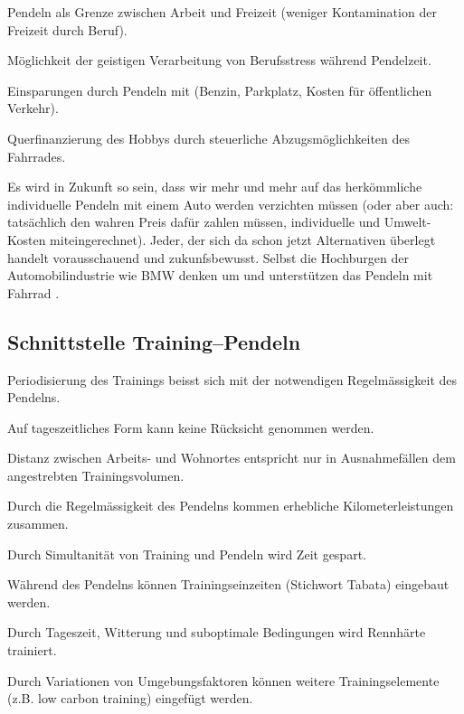   \begin{itemize*}
    \item Pendeln als Grenze zwischen Arbeit und Freizeit (weniger Kontamination der Freizeit durch Beruf).
    \item Möglichkeit der geistigen Verarbeitung von Berufsstress während Pendelzeit.
    \item Einsparungen durch Pendeln mit \rv (Benzin, Parkplatz, Kosten für öffentlichen Verkehr).
    \item Querfinanzierung des Hobbys durch steuerliche Abzugsmöglichkeiten des Fahrrades.
  \end{itemize*}

Es wird in Zukunft so sein, dass wir mehr und mehr auf das herkömmliche
individuelle Pendeln mit einem Auto werden verzichten müssen (oder aber auch:
tatsächlich den wahren Preis dafür zahlen müssen, individuelle und
Umwelt-Kosten miteingerechnet). Jeder, der sich da schon jetzt Alternativen
überlegt handelt vorausschauend und zukunfsbewusst. Selbst die Hochburgen der
Automobilindustrie wie BMW denken um und unterstützen das Pendeln mit Fahrrad
\cite{Hage2018bmwfahrrad}.

\subsection{Schnittstelle Training--Pendeln}


  \begin{itemize*}
    \item Periodisierung des Trainings beisst sich mit der notwendigen Regelmässigkeit des Pendelns.
    \item Auf tageszeitliches Form kann keine Rücksicht genommen werden.
    \item Distanz zwischen Arbeits- und Wohnortes entspricht nur in Ausnahmefällen dem angestrebten Trainingsvolumen.
  \end{itemize*}


  \begin{itemize*}
    \item Durch die Regelmässigkeit des Pendelns kommen erhebliche Kilometerleistungen zusammen.
    \item Durch Simultanität von Training und Pendeln wird Zeit gespart.
    \item Während des Pendelns können Trainingseinzeiten (Stichwort Tabata) eingebaut werden.
    \item Durch Tageszeit, Witterung und suboptimale Bedingungen wird Rennhärte trainiert.
    \item Durch Variationen von Umgebungsfaktoren können weitere Trainingselemente (z.B. low carbon training)
      eingefügt werden.
  \end{itemize*}

